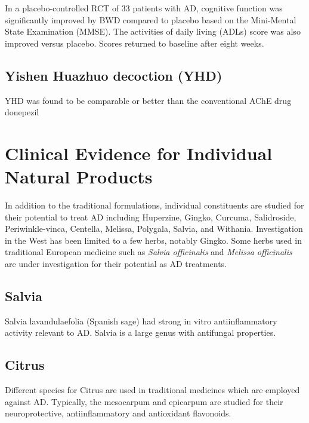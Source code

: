\documentclass[twocolumn]{article}
\begin{document}
In a placebo-controlled RCT of 33 patients with AD,
cognitive function was significantly improved by BWD compared to placebo
based on the Mini-Mental State Examination (MMSE).
The activities of daily living (ADLs) score was also improved
versus placebo.
Scores returned to baseline after eight weeks.
\cite{iwasaki2004randomized}




\subsection{Yishen Huazhuo decoction (YHD)}
YHD was found to be comparable or better than
the conventional AChE drug donepezil

\cite{zhang2015cognitive}


%
%

\section{Clinical Evidence for Individual Natural Products}


In addition to the traditional formulations,
individual constituents are studied for their potential
to treat AD including
Huperzine,
Gingko,
Curcuma,
Salidroside,
Periwinkle-vinca,
Centella,
Melissa,
Polygala,
Salvia,
and Withania.
\cite{sun2013traditional}
Investigation in the West has been limited to a few herbs,
notably Gingko. Some herbs used in traditional European medicine
such as \textit{Salvia officinalis} and \textit{Melissa officinalis}
are under investigation for their potential as AD treatments.
\cite{perry1999medicinal}


\subsection{Salvia}

Salvia lavandulaefolia (Spanish sage)
had strong in vitro antiinflammatory activity relevant to AD.
\cite{perry2001vitro}
Salvia is a large genus with antifungal properties.
\cite{yuce2014essential, tabanca2006chemical}



\subsection{Citrus}

Different species for Citrus are used in traditional medicines
which are employed against AD.
Typically, the mesocarpum and epicarpum
are studied for their neuroprotective, antiinflammatory and antioxidant
flavonoids.
\cite{?}
\end{document}
